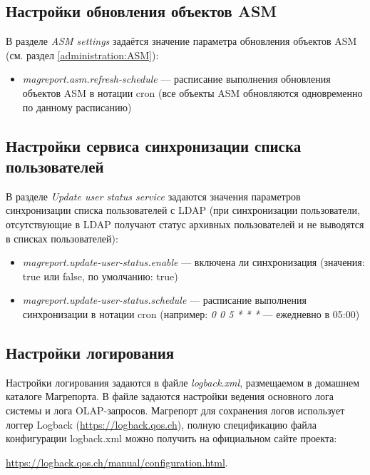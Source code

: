 \documentclass[../user-manual.tex]{subfiles}
\begin{document}
	\subsection{Настройки обновления объектов ASM}\label{subsection:asm-properties}
	
	В разделе \textit{ASM settings} задаётся значение параметра обновления объектов ASM (см. раздел \ref{administration:ASM}):
	
	\begin{itemize}
		\item \textit{magreport.asm.refresh-schedule} --- расписание выполнения обновления объектов ASM в нотации cron (все объекты ASM обновляются одновременно по данному расписанию)
	\end{itemize}
	
	\subsection{Настройки сервиса синхронизации списка пользователей}
	
	В разделе \textit{Update user status service} задаются значения параметров синхронизации списка пользователей с LDAP (при синхронизации пользователи, отсутствующие в LDAP получают статус архивных пользователей и не выводятся в списках пользователей):
	
	\begin{itemize}
		\item \textit{magreport.update-user-status.enable} --- включена ли синхронизация (значения: true или false, по умолчанию: true)
		
		\item \textit{magreport.update-user-status.schedule} --- расписание выполнения синхронизации в нотации cron (например: \textit{0 0 5 * * *} --- ежедневно в 05:00)
	\end{itemize}

	\subsection{Настройки логирования}\label{subsection:logging}
	
	Настройки логирования задаются в файле \textit{logback.xml}, размещаемом в домашнем каталоге Магрепорта. В файле задаются настройки ведения основного лога системы и лога OLAP-запросов. Магрепорт для сохранения логов использует логгер Logback (\href{https://logback.qos.ch}{https://logback.qos.ch}), полную спецификацию файла конфигурации logback.xml можно получить на официальном сайте проекта:
	\begin{center}
	\href{https://logback.qos.ch/manual/configuration.html}{https://logback.qos.ch/manual/configuration.html}.	\end{center}
	
\end{document}
